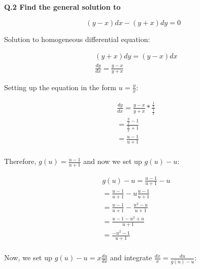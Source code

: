 \documentclass{article}
\begin{document}
    \newpage
    \begin{singlespace}
        \begin{flushleft}
            \textbf{Q.2 Find the general solution to}
        \end{flushleft}
        \begin{center}
            \begin{equation}
                \left( y-x \right)dx - \left( y +x \right)dy = 0
            \end{equation}
        \end{center}
        \begin{flushleft}
            Solution to homogeneous differential equation:
        \end{flushleft}
        \begin{align*}
            &\left( y +x \right)dy = \left( y-x \right)dx  \\
            &\frac{dy}{dx} = \frac{y-x}{y+x}
        \end{align*}
        \begin{flushleft}
            Setting up the equation in the form $u=\frac{y}{x}$:
        \end{flushleft}
        \begin{align*}
            &\frac{dy}{dx} = \frac{y-x}{y+x} * \frac{\frac{1}{x}}{\frac{1}{x}} \\
            &= \frac{\frac{y}{x}-1}{\frac{y}{x}+1} \\
            &= \frac{u-1}{u+1} \\
        \end{align*}
        \begin{flushleft}
            Therefore, $g(u)=\frac{u-1}{u+1}$ and now we set up $g(u)-u$:
        \end{flushleft}
        \begin{align*}
            &g(u)-u = \frac{u-1}{u+1} - u \\
            &= \frac{u-1}{u+1} - u\frac{u-1}{u+1} \\
            &= \frac{u-1}{u+1} - \frac{u^{2}-u}{u+1} \\
            &= \frac{u-1-u^{2}+u}{u+1} \\
            &= \frac{-u^{2}-1}{u+1} \\
        \end{align*}
        \begin{flushleft}
            Now, we set up $g(u)-u=x\frac{du}{dx}$ and integrate $\frac{dx}{x}=\frac{du}{g(u)-u}$:

\end{flushleft}
\end{singlespace}
\end{document}
